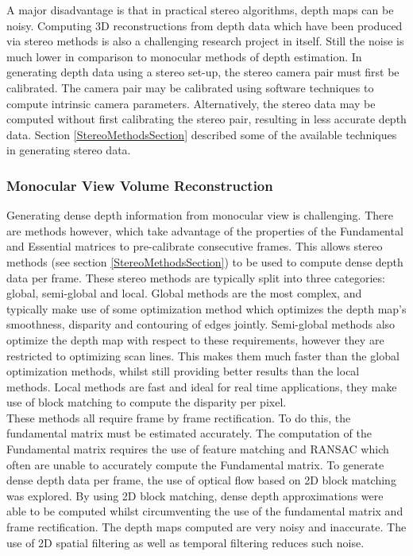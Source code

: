 A major disadvantage is that in practical stereo algorithms, depth maps can be noisy. Computing 3D reconstructions from depth data which have been produced via stereo methods is also a challenging research project in itself. Still the noise is much lower in comparison to monocular methods of depth estimation. In generating depth data using a stereo set-up, the stereo camera pair must first be calibrated. The camera pair may be calibrated using software techniques to compute intrinsic camera parameters. Alternatively, the stereo data may be computed without first calibrating the stereo pair, resulting in less accurate depth data. Section \ref{StereoMethodsSection} described some of the available techniques in generating stereo data. \\

\subsubsection{Monocular View Volume Reconstruction}
\label{subsec:MVVRMethodology}

Generating dense depth information from monocular view is challenging. There are methods however, which take advantage of the properties of the Fundamental and Essential matrices to pre-calibrate consecutive frames. This allows stereo methods (see section \ref{StereoMethodsSection}) to be used to compute dense depth data per frame. These stereo methods are typically split into three categories: global, semi-global and local. Global methods are the most complex, and typically make use of some optimization method which optimizes the depth map's smoothness, disparity and contouring of edges jointly. Semi-global methods also optimize the depth map with respect to these requirements, however they are restricted to optimizing scan lines. This makes them much faster than the global optimization methods, whilst still providing better results than the local methods. Local methods are fast and ideal for real time applications, they make use of block matching to compute the disparity per pixel. \\

These methods all require frame by frame rectification. To do this, the fundamental matrix must be estimated accurately. The computation of the Fundamental matrix requires the use of feature matching and RANSAC which often are unable to accurately compute the Fundamental matrix. To generate dense depth data per frame, the use of optical flow based on 2D block matching was explored. By using 2D block matching, dense depth approximations were able to be computed whilst circumventing the use of the fundamental matrix and frame rectification. The depth maps computed are very noisy and inaccurate. The use of 2D spatial filtering as well as temporal filtering reduces such noise. \\

